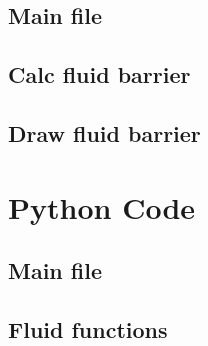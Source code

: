 \documentclass[b5paper,11pt,oneside,fleqn]{article}
\begin{document}
\subsection{Main file}

\clearpage

\subsection{Calc fluid barrier}

\clearpage

\subsection{Draw fluid barrier}



\clearpage
\section{Python Code}

\subsection{Main file}
\clearpage

\subsection{Fluid functions}
\clearpage
\end{document}
